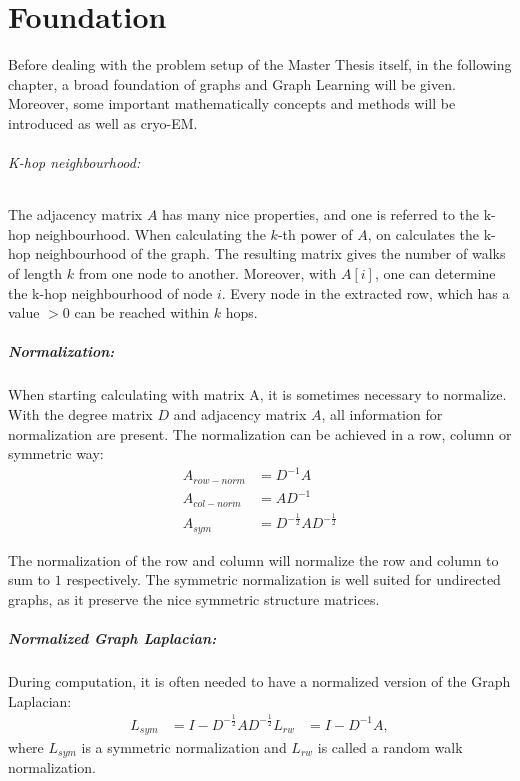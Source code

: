 \chapter{Foundation}
\label{sec:foundation}

Before dealing with the problem setup of the Master Thesis itself, in the following chapter, a broad foundation
of graphs and Graph Learning will be given. Moreover, some important mathematically concepts and methods will be introduced as well as cryo-EM.

\subparagraph{K-hop neighbourhood:}
\label{sec:K-hop neighbourhood}
The adjacency matrix $A$ has many nice properties, and one is referred to the k-hop neighbourhood. 
When calculating the $k$-th power of $A$, on calculates the k-hop neighbourhood of the graph.
The resulting matrix gives the number of walks of length $k$ from one node to another.
Moreover, with $A[i]$, one can determine the k-hop neighbourhood of node $i$. 
Every node in the extracted row, which has a value $> 0$ can be reached within $k$ hops.

\paragraph{Normalization:}
When starting calculating with matrix A, it is sometimes necessary to normalize.
With the degree matrix $D$ and adjacency matrix $A$, all information for normalization are present.
The normalization can be achieved in a row, column or symmetric way:
\begin{equation}
    \begin{aligned}
        A_{row-norm} &= D^{-1} A \\
        A_{col-norm} &= A D^{-1} \\
        A_{sym}      &=  D^{-\frac{1}{2}} A D^{-\frac{1}{2}}    
    \end{aligned}
\end{equation}

The normalization of the row and column will normalize the row and column to sum to $1$ respectively.
The symmetric normalization is well suited for undirected graphs, as it preserve the nice symmetric structure matrices.




\paragraph{Normalized Graph Laplacian:}
During computation, it is often needed to have a normalized version of the Graph Laplacian: \newline
\begin{equation}
    \label{eq:normalizedGraphLaplacian}
    \begin{aligned}
        L_{sym} &= I - D^{-\frac{1}{2}} A D^{-\frac{1}{2}}
        L_{rw}  &= I - D^{-1} A,
    \end{aligned}
\end{equation}
where $L_{sym}$ is a symmetric normalization and $L_{rw}$ is called a random walk normalization.


